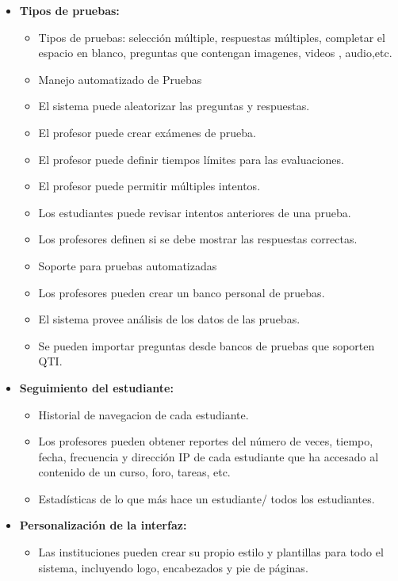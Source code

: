 	\begin{itemize}
		\item \textbf{Tipos de pruebas:}
			\begin{itemize}
				\item Tipos de pruebas: selección múltiple, respuestas múltiples, completar el espacio en blanco,  preguntas que contengan imagenes, videos , audio,etc.
				\item Manejo automatizado de Pruebas
				\item El sistema puede aleatorizar las preguntas  y respuestas.
				\item El profesor puede crear exámenes de prueba.
				\item El profesor puede definir tiempos límites para las evaluaciones.
				\item El profesor puede permitir múltiples intentos.
				\item Los estudiantes puede revisar intentos anteriores de una prueba.
				\item Los profesores definen si se debe mostrar las respuestas correctas.
				\item Soporte para pruebas automatizadas
				\item Los profesores pueden crear un banco personal de pruebas.
				\item El sistema provee análisis de los datos de las pruebas.
				\item Se pueden importar preguntas desde bancos de pruebas que soporten QTI.
			\end{itemize}
	\end{itemize}
	\begin{itemize}
		\item \textbf{Seguimiento del estudiante:}
			\begin{itemize}
				\item Historial de navegacion de cada estudiante.
				\item Los profesores pueden obtener reportes del número de veces, tiempo, fecha, frecuencia y dirección IP de cada estudiante que ha accesado al contenido de un curso, foro, tareas, etc.
				\item Estadísticas de lo que más hace un estudiante/ todos los estudiantes.
			\end{itemize}
	\end{itemize}
	\begin{itemize}
		\item \textbf{Personalización de la interfaz:}
			\begin{itemize}
				\item Las instituciones pueden crear su propio estilo y plantillas para todo el sistema, incluyendo logo, encabezados y pie de páginas.
			\end{itemize}
	\end{itemize}
